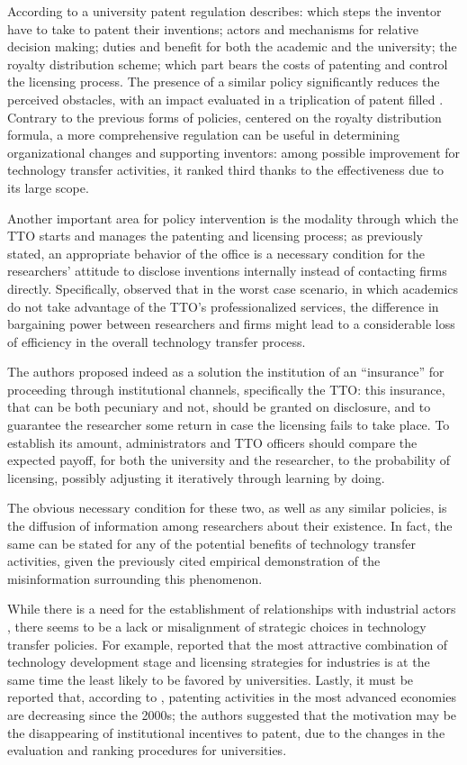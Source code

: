 According to \citet{Baldini2007} a university patent regulation describes: which steps the inventor have to take to patent their inventions; actors and mechanisms for relative decision making; duties and benefit for both the academic and the university; the royalty distribution scheme; which part bears the costs of patenting and control the licensing process. The presence of a similar policy significantly reduces the perceived obstacles, with an impact evaluated in a triplication of patent filled \citep{Baldini2006,Baldini2007}. Contrary to the previous forms of policies, centered on the royalty distribution formula, a more comprehensive regulation can be useful in determining organizational changes and supporting inventors: among possible improvement for technology transfer activities, it ranked third thanks to the effectiveness due to its large scope. 

Another important area for policy intervention is the modality through which the TTO starts and manages the patenting and licensing process; as previously stated, an appropriate behavior of the office is a necessary condition for the researchers' attitude to disclose inventions internally instead of contacting firms directly. Specifically, \citet{Panagopoulos2013} observed that in the worst case scenario, in which academics do not take advantage of the TTO's professionalized services, the difference in bargaining power between researchers and firms might lead to a considerable loss of efficiency in the overall technology transfer process.

The authors proposed indeed as a solution the institution of an \enquote{insurance} for proceeding through institutional channels, specifically the TTO: this insurance, that can be both pecuniary and not, should be granted on disclosure, and to guarantee the researcher some return in case the licensing fails to take place. To establish its amount, administrators and TTO officers should compare the expected payoff, for both the university and the researcher, to the probability of licensing, possibly adjusting it iteratively through learning by doing.

The obvious necessary condition for these two, as well as any similar policies, is the diffusion of information among researchers about their existence. In fact, the same can be stated for any of the potential benefits of technology transfer activities, given the previously cited empirical demonstration of the misinformation surrounding this phenomenon. 

While there is a need for the establishment of relationships with industrial actors \citep{Baldini2007}, there seems to be a lack or misalignment of strategic choices in technology transfer policies. For example, \citet{Phan2005} reported that the most attractive combination of technology development stage and licensing strategies for industries is at the same time the least likely to be favored by universities. Lastly, it must be reported that, according to \citet{Leydesdorff2010}, patenting activities in the most advanced economies are decreasing since the 2000s; the authors suggested that the motivation may be the disappearing of institutional incentives to patent, due to the changes in the evaluation and ranking procedures for universities.

